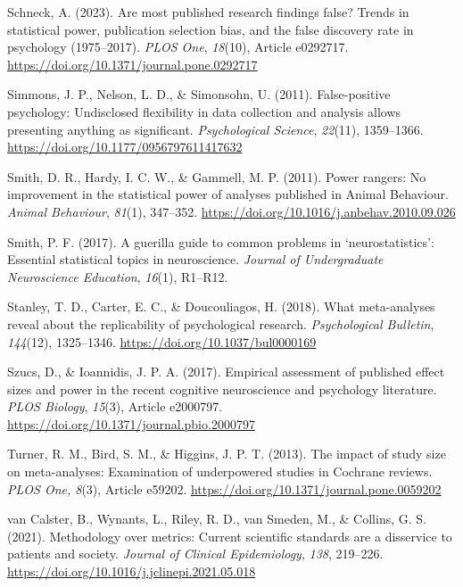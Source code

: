 \documentclass[authordate, meta, issue]{jote-new-article}
\begin{document}
	Schneck, A. (2023). Are most published research findings false? Trends in statistical power, publication selection bias, and the false discovery rate in psychology (1975--2017). \emph{PLOS One}, \emph{18}(10), Article e0292717. \url{https://doi.org/10.1371/journal.pone.0292717}



	Simmons, J. P., Nelson, L. D., \& Simonsohn, U. (2011). False-positive psychology: Undisclosed flexibility in data collection and analysis allows presenting anything as significant. \emph{Psychological Science}, \emph{22}(11), 1359--1366. \url{https://doi.org/10.1177/0956797611417632}



	Smith, D. R., Hardy, I. C. W., \& Gammell, M. P. (2011). Power rangers: No improvement in the statistical power of analyses published in Animal Behaviour. \emph{Animal Behaviour}, \emph{81}(1), 347--352. \url{https://doi.org/10.1016/j.anbehav.2010.09.026}



	Smith, P. F. (2017). A guerilla guide to common problems in ‘neurostatistics': Essential statistical topics in neuroscience. \emph{Journal of Undergraduate Neuroscience Education}, \emph{16}(1), R1--R12.



	Stanley, T. D., Carter, E. C., \& Doucouliagos, H. (2018). What meta-analyses reveal about the replicability of psychological research. \emph{Psychological Bulletin}, \emph{144}(12), 1325--1346. \url{https://doi.org/10.1037/bul0000169}



	Szucs, D., \& Ioannidis, J. P. A. (2017). Empirical assessment of published effect sizes and power in the recent cognitive neuroscience and psychology literature. \emph{PLOS Biology}, \emph{15}(3), Article e2000797. \url{https://doi.org/10.1371/journal.pbio.2000797}



	Turner, R. M., Bird, S. M., \& Higgins, J. P. T. (2013). The impact of study size on meta-analyses: Examination of underpowered studies in Cochrane reviews. \emph{PLOS One, 8}(3), Article e59202. \url{https://doi.org/10.1371/journal.pone.0059202}



	van Calster, B., Wynants, L., Riley, R. D., van Smeden, M., \& Collins, G. S. (2021). Methodology over metrics: Current scientific standards are a disservice to patients and society. \emph{Journal of Clinical Epidemiology}, \emph{138}, 219--226. \url{https://doi.org/10.1016/j.jclinepi.2021.05.018}
\end{document}

